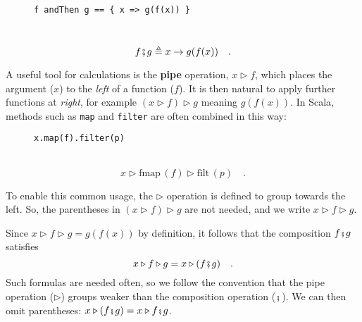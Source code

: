 \begin{wrapfigure}{l}{0.5\columnwidth}%
\vspace{-0.65\baselineskip}
\begin{lstlisting}
f andThen g == { x => g(f(x)) }
\end{lstlisting}

\vspace{-0.25\baselineskip}
\end{wrapfigure}%

~\vspace{-0.35\baselineskip}
\[
f\bef g\triangleq x\rightarrow g(f(x))\quad.
\]
\vspace{-0.85\baselineskip}

A useful tool for calculations is the \textbf{pipe}
operation, $x\triangleright f$, which places the argument ($x$)
to the \emph{left} of a function ($f$). It is then natural to apply
further functions at \emph{right}, for example $(x\triangleright f)\triangleright g$
meaning $g(f(x))$. In Scala, methods such as \lstinline!map! and
\lstinline!filter! are often combined in this way:

\begin{wrapfigure}{l}{0.5\columnwidth}%
\vspace{-0.65\baselineskip}
\begin{lstlisting}
x.map(f).filter(p)
\end{lstlisting}

\vspace{-0.25\baselineskip}
\end{wrapfigure}%

~\vspace{-0.35\baselineskip}
\[
x\triangleright\text{fmap}\,(f)\triangleright\text{filt}\,(p)\quad.
\]
\vspace{-0.85\baselineskip}

To enable this common usage, the $\triangleright$ operation is defined
to group towards the left. So, the parentheses in $(x\triangleright f)\triangleright g$
are not needed, and we write $x\triangleright f\triangleright g$.

Since $x\triangleright f\triangleright g=g(f(x))$ by definition,
it follows that the composition $f\bef g$ satisfies
\[
x\triangleright f\triangleright g=x\triangleright(f\bef g)\quad.
\]
Such formulas are needed often, so we follow the convention that the
pipe operation ($\triangleright$) groups weaker than the composition
operation ($\bef$). We
can then omit parentheses: $x\triangleright(f\bef g)=x\triangleright f\bef g$. 

